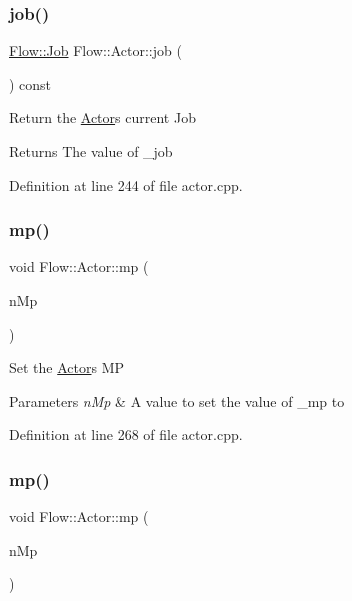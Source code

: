 \subsubsection{\texorpdfstring{job()}{job()}\hspace{0.1cm}{\footnotesize\ttfamily [2/2]}}
{\footnotesize\ttfamily \hyperlink{namespace_flow_a05bb774db920847e46f3779aaef1b07b}{Flow\+::\+Job} Flow\+::\+Actor\+::job (\begin{DoxyParamCaption}{ }\end{DoxyParamCaption}) const}

Return the \hyperlink{class_flow_1_1_actor}{Actor}\textquotesingle{}s current Job \begin{DoxyReturn}{Returns}
The value of \+\_\+job 
\end{DoxyReturn}


Definition at line 244 of file actor.\+cpp.

\hypertarget{class_flow_1_1_actor_aca6243d244b329bed207352fdc3646be}{}\label{class_flow_1_1_actor_aca6243d244b329bed207352fdc3646be} 
\subsubsection{\texorpdfstring{mp()}{mp()}\hspace{0.1cm}{\footnotesize\ttfamily [1/3]}}
{\footnotesize\ttfamily void Flow\+::\+Actor\+::mp (\begin{DoxyParamCaption}\item[{int}]{n\+Mp }\end{DoxyParamCaption})}

Set the \hyperlink{class_flow_1_1_actor}{Actor}\textquotesingle{}s MP 
\begin{DoxyParams}{Parameters}
{\em n\+Mp} & A value to set the value of \+\_\+mp to \\
\hline
\end{DoxyParams}


Definition at line 268 of file actor.\+cpp.

\hypertarget{class_flow_1_1_actor_a655ad26be9ed06a24653c3413390ac10}{}\label{class_flow_1_1_actor_a655ad26be9ed06a24653c3413390ac10} 
\subsubsection{\texorpdfstring{mp()}{mp()}\hspace{0.1cm}{\footnotesize\ttfamily [2/3]}}
{\footnotesize\ttfamily void Flow\+::\+Actor\+::mp (\begin{DoxyParamCaption}\item[{const \hyperlink{class_flow_1_1_i_stat}{I\+Stat} \&}]{n\+Mp }\end{DoxyParamCaption})}

